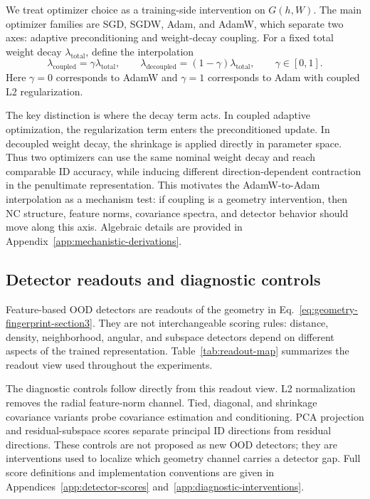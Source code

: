 We treat optimizer choice as a training-side intervention on
\(G(h,W)\). The main optimizer families are SGD, SGDW, Adam, and AdamW, which
separate two axes: adaptive preconditioning and weight-decay coupling. For a
fixed total weight decay \(\lambda_{\mathrm{total}}\), define the interpolation
\begin{equation}
    \lambda_{\mathrm{coupled}}
    =
    \gamma\lambda_{\mathrm{total}},
    \qquad
    \lambda_{\mathrm{decoupled}}
    =
    (1-\gamma)\lambda_{\mathrm{total}},
    \qquad
    \gamma\in[0,1].
    \label{eq:coupled-decoupled-interpolation-section3}
\end{equation}
Here \(\gamma=0\) corresponds to AdamW and \(\gamma=1\) corresponds to Adam with
coupled L2 regularization.

The key distinction is where the decay term acts. In coupled adaptive
optimization, the regularization term enters the preconditioned update. In
decoupled weight decay, the shrinkage is applied directly in parameter space.
Thus two optimizers can use the same nominal weight decay and reach comparable
ID accuracy, while inducing different direction-dependent contraction in the
penultimate representation. This motivates the AdamW-to-Adam interpolation as a
mechanism test: if coupling is a geometry intervention, then NC structure,
feature norms, covariance spectra, and detector behavior should move along this
axis. Algebraic details are provided in
Appendix~\ref{app:mechanistic-derivations}.

\subsection{Detector readouts and diagnostic controls}
\label{subsec:geometry-channels-detectors}

Feature-based OOD detectors are readouts of the geometry in
Eq.~\eqref{eq:geometry-fingerprint-section3}. They are not interchangeable
scoring rules: distance, density, neighborhood, angular, and subspace detectors
depend on different aspects of the trained representation. Table~\ref{tab:readout-map}
summarizes the readout view used throughout the experiments.



The diagnostic controls follow directly from this readout view. L2
normalization removes the radial feature-norm channel. Tied, diagonal, and
shrinkage covariance variants probe covariance estimation and conditioning. PCA
projection and residual-subspace scores separate principal ID directions from
residual directions. These controls are not proposed as new OOD detectors; they
are interventions used to localize which geometry channel carries a detector
gap. Full score definitions and implementation conventions are given in
Appendices~\ref{app:detector-scores} and~\ref{app:diagnostic-interventions}.

